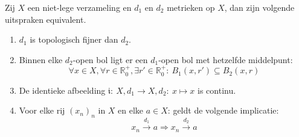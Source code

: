 \documentclass[main.tex]{subfiles}
\begin{document}
\begin{st}
  \label{st:topologisch-fijner-formuleringen}
  Zij $X$ een niet-lege verzameling en $d_{1}$ en $d_{2}$ metrieken op $X$, dan zijn volgende uitspraken equivalent.
  \begin{enumerate}
  \item $d_{1}$ is topologisch fijner dan $d_{2}$.
  \item Binnen elke $d_{2}$-open bol ligt er een $d_{1}$-open bol met hetzelfde middelpunt:
    \[ \forall x\in X, \forall r \in \mathbb{R}_{0}^{+}, \exists r' \in \mathbb{R}_{0}^{+}:\ B_{1}(x,r') \subseteq B_{2}(x,r) \]
  \item De identieke afbeelding $\mathfrak{i}:\ X,d_{1} \rightarrow X,d_{2}:\ x \mapsto x$ is continu.
  \item Voor elke rij $(x_{n})_{n}$ in $X$ en elke $a\in X$: geldt de volgende implicatie:
    \[ x_{n} \overset{d_{1}}{\rightarrow} a \Rightarrow x_{n} \overset{d_{2}}{\rightarrow} a \]
  \end{enumerate}


\end{st}
\end{document}
